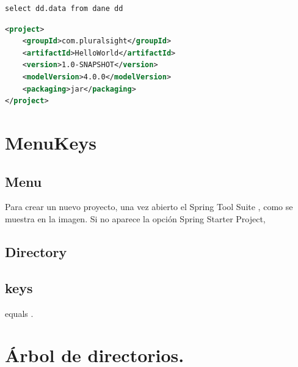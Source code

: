 	
	
	
	
	
	
\begin{lstlisting}[caption={Some Java code},label={lst:label},style=terminal]
select dd.data from dane dd 
\end{lstlisting}
		
\begin{lstlisting}[caption={A simple listing.}, label={lst:simple}, language=XML]
<project>
	<groupId>com.pluralsight</groupId>
	<artifactId>HelloWorld</artifactId>
	<version>1.0-SNAPSHOT</version>
	<modelVersion>4.0.0</modelVersion>
	<packaging>jar</packaging>
</project>
	\end{lstlisting}
\section{MenuKeys}

	\subsection{Menu}

	Para crear un nuevo proyecto, una vez abierto el Spring Tool Suite , como se muestra en la imagen. Si no aparece la opción Spring Starter Project, 
	
	\subsection{Directory}
	
	
	\subsection{keys}
	
	 equals .
	
\section{Árbol de directorios.}

